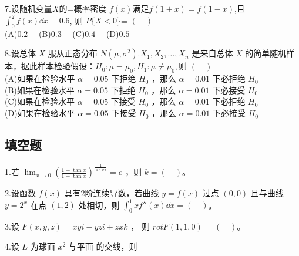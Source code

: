 7.设随机变量$X$的=概率密度 $f(x)$满足$f(1+x)=f(1-x)$,且 $\int_0^2 f(x)\dd{x}=0.6$, 则 $P\{X<0\}$= $(\quad)$\\
(A)$0.2 \quad$
(B)$0.3 \quad$
(C)$0.4 \quad$
(D)$0.5 \quad$


8.设总体 $X$ 服从正态分布 $N(\mu,\sigma^2).X_1,X_2,\dots,X_n$ 是来自总体 $X$ 的简单随机样本，据此样本检验假设：$H_0:\mu=\mu_0,H_1:\mu\neq \mu_0,$则 $(\quad)$\\
(A)如果在检验水平 $\alpha=0.05$ 下拒绝 $H_0$ ，那么 $\alpha=0.01$ 下必拒绝 $H_0$\\
(B)如果在检验水平 $\alpha=0.05$ 下拒绝 $H_0$ ，那么 $\alpha=0.01$ 下必接受 $H_0$\\
(C)如果在检验水平 $\alpha=0.05$ 下接受 $H_0$ ，那么 $\alpha=0.01$ 下必拒绝 $H_0$\\
(D)如果在检验水平 $\alpha=0.05$ 下接受 $H_0$ ，那么 $\alpha=0.01$ 下必接受 $H_0$

\subsection{填空题}
1.若 $\displaystyle \lim_{x \to  0} (\frac{1-\tan x}{1+\tan x})^\frac{1}{\sin kx}=e$ ，则 $k=(\quad)$。

2.设函数 $f(x)$ 具有2阶连续导数，若曲线 $y=f(x)$ 过点 $(0,0)$ 且与曲线 $y=2^x$ 在点 $(1,2)$ 处相切，则 $\int_0^1 xf''(x) \dd{x}= (\quad)$。

3.设 $F(x,y,z)=xyi-yzi+zxk$ ， 则 $rot  F(1,1,0)$ = $(\quad)$。

4.设 $L$ 为球面 $x^2$ 与平面 的交线，则